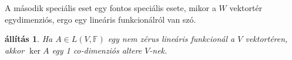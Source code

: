 \documentclass[a4paper, showtrims]{memoir}
\makeatletter
\renewenvironment{proof}[1][\proofname]
    {\par\pushQED{\qed}%
    \normalfont \topsep6\p@\@plus6\p@\relax
    \trivlist
    \item[\hskip\labelsep
        \itshape
    #1\@addpunct{:}]\ignorespaces}
    {\popQED\endtrivlist\@endpefalse}
\theoremstyle{plain}
\newtheorem{proposition}{állítás}[chapter]
\theoremstyle{remark}
\theoremstyle{definition}
\newtheorem{definition}[proposition]{definíció}
\DeclareMathOperator{\lin}{lin}
\DeclareMathOperator{\rrank}{rrank}
\DeclareMathOperator{\srank}{srank}
\DeclareMathOperator{\rank}{rank}
\makeatother
\begin{document}
A második speciális eset egy fontos speciális esete, 
mikor a $W$ vektortér egydimenziós, ergo egy lineáris funkcionálról van szó.
\begin{proposition}
	Ha $A\in L\left( V,\mathbb{F} \right)$ egy nem zérus lineáris funkcionál a $V$ vektortéren,
	akkor $\ker A$ egy 1 co-dimenziós altere $V$-nek.
\end{proposition}
%
%
%
\end{document}
